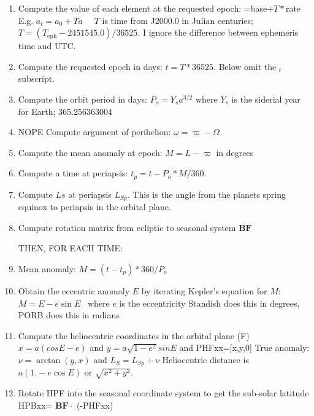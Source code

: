 \documentclass[draft]{article}
\newcommand{\qdp}{$. \! ^\circ \! $} %
\begin{document}
\begin{enumerate}    %
\item  Compute the value of each element at the requested epoch: =base$+T\ast$rate
\qii E.g. $a_t=a_0+ T\dot{a}$  \ \ $T$ is time from J2000.0 in Julian centuries;
\qii  $T=\left( T_\mathrm{eph}-2451545.0 \right)/36525. $ I ignore the difference between ephemeris time and UTC. 
\item Compute the requested epoch in days: $ t=T*36525.$
\qi Below omit the $_t$ subscript.
\item Compute the orbit period in days: $P_o= Y_s a^{3/2}$ where $Y_s$ is the siderial year for Earth; 365.256363004
\item NOPE Compute argument of perihelion: $ \omega=\varpi-\Omega$
\item Compute the mean anomaly at epoch: $M=L-\varpi $ in degrees
\item Compute a time at periapsis: $t_p=   t-P_o*M/360.$
\item Compute $Ls$ at periapsis $L_{Sp}$. This is the angle from the planets spring equinox to periapsis in the orbital plane.
\item Compute rotation matrix from ecliptic to seasonal system $\mathbf{BF}$

 THEN, FOR EACH TIME:

\item Mean anomaly: $  M=(t-t_p)* 360/P_o $
\item Obtain the eccentric anomaly $E$ by iterating Kepler's equation for $M$:
\qiii $M= E- e \sin E $ \ where $e$ is the eccentricity
\qi Standish does this in degrees, PORB does this in radians
\item Compute the heliocentric coordinates in the orbital plane (F)
\qi $x =a(cos E-e)$ and $ y=a \sqrt{1-e^2} sin E$ and PHFxx=[x,y,0]
\qi True anomaly: $ \nu =\arctan (y,x)$ and $L_S = L_{Sp}+\nu $
\qi Heliocentric distance is $a( 1.-e \cos E )$ or $\sqrt{x^2 + y^2}$.
\item Rotate HPF into the seasonal coordinate system to get the sub-solar latitude
\qi HPBxx= $\mathbf{BF} \cdot $ (-PHFxx)


\end{enumerate}
\end{document}
